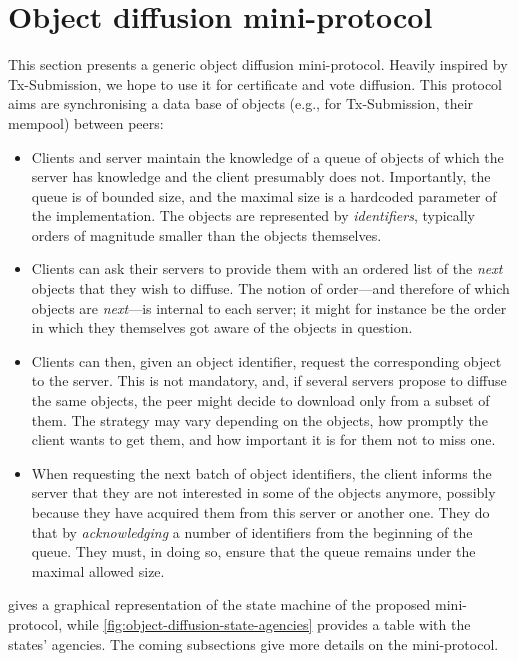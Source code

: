 \section{Object diffusion mini-protocol}%
\label{sec:object-diffusion-protocol}

This section presents a generic object diffusion mini-protocol.
Heavily inspired by Tx-Submission, we hope to use it for certificate and vote diffusion.
This protocol aims are synchronising a data base of objects (e.g., for Tx-Submission, their mempool) between peers:
%
\begin{itemize}
\item
  Clients and server maintain the knowledge of a queue of objects of which the server has knowledge and the client presumably does not.
  Importantly, the queue is of bounded size, and the maximal size is a hardcoded parameter of the
  implementation.
  The objects are represented by {\em identifiers}, typically orders of magnitude smaller than the objects themselves.

\item
  Clients can ask their servers to provide them with an ordered list of the {\em next} objects that they wish to diffuse.
  The notion of order---and therefore of which objects are {\em next}---is internal to each server; it might for instance be the order in which they themselves got aware of the objects in question.

\item
  Clients can then, given an object identifier, request the corresponding object to the server.
  This is not mandatory, and, if several servers propose to diffuse the same objects, the peer might decide to download only from a subset of them.
  The strategy may vary depending on the objects, how promptly the client wants to get them, and how important it is for them not to miss one.

\item
  When requesting the next batch of object identifiers, the client informs the server that they are not interested in some of the objects anymore, possibly because they have acquired them from this server or another one.
  They do that by {\em acknowledging} a number of identifiers from the beginning of the queue.
  They must, in doing so, ensure that the queue remains under the maximal allowed size.
\end{itemize}

 gives a graphical representation of the state machine of the proposed mini-protocol, while \cref{fig:object-diffusion-state-agencies} provides a table with the states' agencies.
The coming subsections give more details on the mini-protocol.

